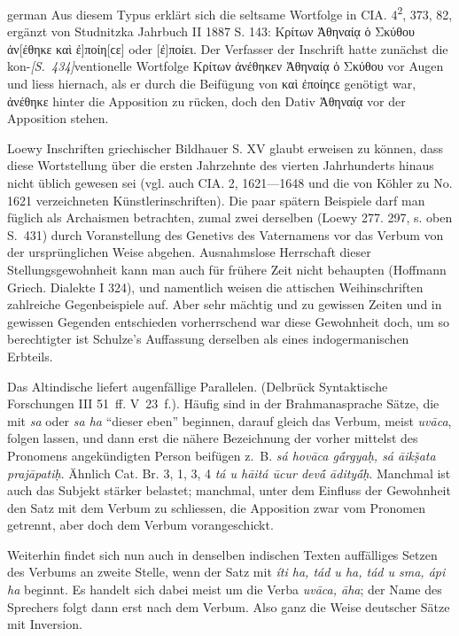 \begin{otherlanguage*}{german}
Aus diesem Typus erklärt sich die seltsame Wortfolge in CIA. 4\textsuperscript{2}, 373, 82, ergänzt von Studnitzka Jahrbuch II 1887 S. 143: Κρίτων Ἀθηναίᾳ ὁ Σκύθου ἀν[έθηκε καὶ ἐ]ποίη[ϲε] oder [ἐ]ποίει. Der Verfasser der  Inschrift hatte zunächst die kon-\hypertarget{p434}{\emph{[S.~434]}}\label{p434}ventionelle Wortfolge Κρίτων ἀνέθηκεν Ἀθηναίᾳ ὁ Σκύθου vor Augen und liess hiernach, als er durch die Beifügung von καὶ ἐποίηϲε genötigt war, ἀνέθηκε hinter die Apposition zu rücken, doch den Dativ Ἀθηναίᾳ vor der Apposition stehen.

Loewy Inschriften griechischer Bildhauer S. XV glaubt erweisen zu können, dass diese Wortstellung über die ersten Jahrzehnte des vierten Jahrhunderts hinaus nicht üblich gewesen sei (vgl. auch CIA. 2, 1621—1648 und die von Köhler zu No. 1621 verzeichneten Künstlerinschriften). Die paar spätern Beispiele darf man füglich als Archaismen betrachten, zumal zwei derselben (Loewy 277. 297, s. oben S.~431) durch Voranstellung des Genetivs des Vaternamens vor das Verbum von der ursprünglichen Weise abgehen. Ausnahmslose Herrschaft dieser Stellungsgewohnheit kann man auch für frühere Zeit nicht behaupten (Hoffmann Griech. Dialekte I 324), und namentlich weisen die attischen Weihinschriften zahlreiche Gegenbeispiele auf. Aber sehr mächtig und zu gewissen Zeiten und in gewissen Gegenden entschieden vorherrschend war diese Gewohnheit doch, um so berechtigter ist Schulze’s Auffassung derselben als eines indogermanischen Erbteils.

Das Altindische liefert augenfällige Parallelen. (Delbrück Syntaktische Forschungen III 51~ff. V~23~f.). Häufig sind in der Brahmanasprache Sätze, die mit \emph{sa} oder \emph{sa ha} “dieser eben” beginnen, darauf gleich das Verbum, meist \emph{uvāca}, folgen lassen, und dann erst die nähere Bezeichnung der vorher mittelst des Pronomens angekündigten Person beifügen z.~B. \emph{sá hovāca gā́rgyaḥ, sá āikṣ̌ata prajāpatiḥ}. Ähnlich Cat. Br. 3, 1, 3, 4 \emph{tá u hāitá ūcur devā́ ādityā́ḥ}. Manchmal ist auch das Subjekt stärker belastet; manchmal, unter dem Einfluss der Gewohnheit den Satz mit dem Verbum zu schliessen, die Apposition zwar vom Pronomen getrennt, aber doch dem Verbum vorangeschickt.

Weiterhin findet sich nun auch in denselben indischen Texten auffälliges Setzen des Verbums an zweite Stelle, wenn der Satz mit \emph{íti ha, tád u ha, tád u sma, ápi ha} beginnt. Es handelt sich dabei meist um die Verba \emph{uvāca, āha}; der Name des Sprechers folgt dann erst nach dem Verbum. Also ganz die Weise deutscher Sätze mit Inversion.


\end{otherlanguage*}
